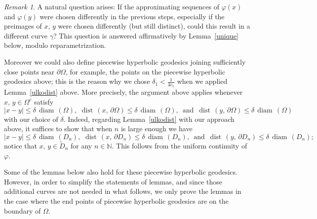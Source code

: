 \documentclass[reqno,11pt]{amsart}
\makeatletter
\def\dist{{\mathop\mathrm{\,dist\,}}}
\def\wz{\widetilde}
\def\diam{{\mathop\mathrm{\,diam\,}}}
\numberwithin{equation}{section}
\theoremstyle{remark}
\newtheorem{rem}[thm]{Remark}%
\makeatother
\begin{document}
\begin{rem}
A natural question arises: If the approximating sequences  of $\varphi(x)$ and $\varphi(y)$ were chosen differently in the previous steps, especially if the preimages  of $x,\,y$ were chosen differently (but still distinct),  could this result in a different curve $\gamma$? This question is answered affirmatively by Lemma~\ref{unique} below, modulo reparametrization. 


Moreover we could also define piecewise hyperbolic geodesics joining sufficiently close points near $\partial\Omega$, for example, the points on the piecewise hyperbolic geodesics above; this is the reason why we chose $\delta_1< \frac {1}{4c_1}$ when we applied Lemma~\ref{ulkodist} above. 
More precisely, the argument above applies whenever $x,\,y\in \Omega^c$ satisfy
$$|x-y|\le \delta \diam(\Omega),\, \dist(x,\,\partial \Omega)\le \delta \diam(\Omega),\, \text{ and } \dist(y,\,\partial \Omega)\le \delta \diam(\Omega)$$
with our choice of $\delta$. Indeed, regarding Lemma~\ref{ulkodist} with our approach above, it suffices to show that when $n$ is large enough  we have
$$|x-y|\le \delta \diam(D_n),\, \dist(x,\,\partial D_n)\le \delta \diam( D_n),\, \text{ and } \dist(y,\,\partial D_n)\le \delta \diam(D_n);$$
notice that $x,\,y\in \wz D_n$ for any $n\in \mathbb N$. This follows from the uniform continuity of $\varphi$.


Some of the lemmas below also hold for these  piecewise hyperbolic geodesics. However, in order to simplify the statements of lemmas, and since those additional curves are not needed in what follows, we only prove the lemmas in the case where the end points of piecewise hyperbolic geodesics are on the boundary of $\Omega$. 
\end{rem}

\end{document}
